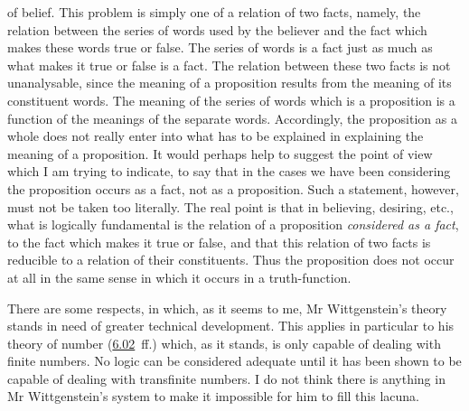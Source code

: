 \documentclass[12pt,oneside]{book}[2007/10/19]
\newcommand{\PropERef}[1]{\hyperref[PropE:#1]{#1}}
\begin{document}
of belief. This problem is simply one of a relation of
two facts, namely, the relation between the series of words
used by the believer and the fact which makes these
words true or false. The series of words is a fact just
as much as what makes it true or false is a fact. The
relation between these two facts is not unanalysable, since
the meaning of a proposition results from the meaning
of its constituent words. The meaning of the series of
words which is a proposition is a function of the meanings
of the separate words. Accordingly, the proposition as a
whole does not really enter into what has to be explained
in explaining the meaning of a proposition. It would
perhaps help to suggest the point of view which I am
trying to indicate, to say that in the cases we have been
considering the proposition occurs as a fact, not as a
proposition. Such a statement, however, must not be
taken too literally. The real point is that in believing,
desiring, etc., what is logically fundamental is the relation
of a proposition \emph{considered as a fact}, to the fact which
makes it true or false, and that this relation of two facts
is reducible to a relation of their constituents. Thus the
proposition does not occur at all in the same sense in
which it occurs in a truth-function.

There are some respects, in which, as it seems to me,
Mr Wittgenstein's theory stands in need of greater
technical development. This applies in particular to
his theory of number (\PropERef{6.02}~ff.) which, as it stands, is only
capable of dealing with finite numbers. No logic can
be considered adequate until it has been shown to be
capable of dealing with transfinite numbers. I do not
think there is anything in Mr Wittgenstein's system to
make it impossible for him to fill this lacuna.
\end{document}
